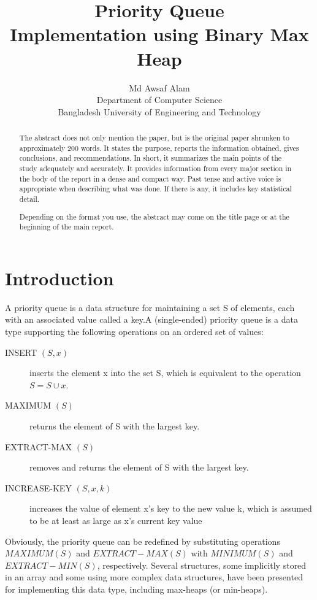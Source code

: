 \documentclass{article}
\begin{document}
\title{Priority Queue \\ Implementation using Binary Max Heap}


\author{Md Awsaf Alam \\
Department of Computer Science\\
Bangladesh University of Engineering and Technology\\
}
\date{}

\maketitle
\newpage
\tableofcontents
\newpage
\begin{abstract}
The abstract does not only mention the paper, but is the original paper shrunken to approximately 200 words. It states the purpose, reports the information obtained, gives conclusions, and recommendations. In short, it summarizes the main points of the study adequately and accurately. It provides information from every major section in the body of the report in a dense and compact way. Past tense and active voice is appropriate when describing what was done. If there is any, it includes key statistical detail.

Depending on the format you use, the abstract may come on the title page or at the beginning of the main report.

\end{abstract}
\newpage
\section{Introduction}
A priority queue is a data structure for maintaining a set S of elements, each with an associated value called a key.A (single-ended) priority queue is a data type supporting the following operations on an ordered set of values:
\newline
\begin{description}
  \item[INSERT $(S,x)$] inserts the element x into the set S, which is equivalent to the operation $S = S \cup {x} $.
  \item[MAXIMUM $(S)$] returns the element of S with the largest key.
  \item[EXTRACT-MAX $(S)$] removes and returns the element of S with the largest key.
  \item[INCREASE-KEY $(S,x,k)$] increases the value of element x’s key to the new value k,
which is assumed to be at least as large as x’s current key value
\end{description}
Obviously, the priority queue can be redefined by substituting operations \textbf{$MAXIMUM(S)$} and \textbf{$EXTRACT-MAX(S)$} with \textbf{$MINIMUM(S)$} and \textbf{$EXTRACT-MIN(S)$}, respectively. Several structures, some implicitly stored in an array and some using more complex data structures, have been presented for implementing this data type, including max-heaps (or min-heaps).
\end{document}
